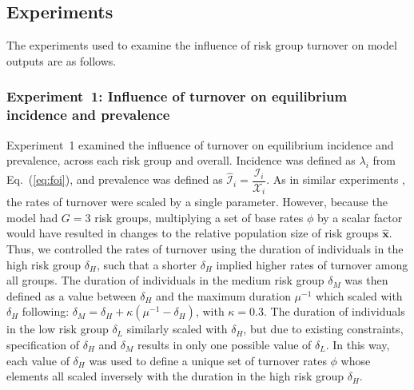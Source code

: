 \subsection{Experiments}
\label{ss:exp}
The experiments used to examine
the influence of risk group turnover on model outputs
are as follows.
\subsubsection{Experiment~1: Influence of turnover on equilibrium incidence and prevalence}
\label{sss:exp-prev-inc}
Experiment~1 examined the influence of turnover on
equilibrium incidence and prevalence, across each risk group and overall.
Incidence was defined as $\lambda_i$ from Eq.~(\ref{eq:foi}), and
prevalence was defined as $\hat{\mathcal{I}}_i = \dfrac{\mathcal{I}_i}{\mathcal{X}_i}$.
As in similar experiments \citep{Zhang2012,Henry2015},
the rates of turnover were scaled by a single parameter.
However, because the model had $G = 3$ risk groups,
multiplying a set of base rates $\phi$ by a scalar factor
would have resulted in changes to the relative population size of risk groups $\bm{\hat{x}}$.
Thus, we controlled the rates of turnover using
the duration of individuals in the high risk group $\delta_H$,
such that a shorter $\delta_H$ implied higher rates of turnover among all groups.
The duration of individuals in the medium risk group $\delta_M$
was then defined as a value between $\delta_H$ and the maximum duration $\mu^{-1}$
which scaled with $\delta_H$ following:
$\delta_M = \delta_H + \kappa \left(\mu^{-1} - \delta_H\right)$, with $\kappa = 0.3$.
The duration of individuals in the low risk group $\delta_L$
similarly scaled with $\delta_H$,
but due to existing constraints,
specification of $\delta_H$ and $\delta_M$
results in only one possible value of $\delta_L$.
In this way, each value of $\delta_H$ was used to define a unique set of turnover rates $\phi$
whose elements all scaled inversely with the duration in the high risk group $\delta_H$.
